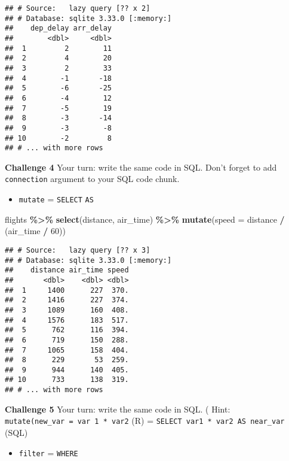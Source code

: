 \documentclass[
]{book}
\newenvironment{Shaded}{\begin{snugshade}}{\end{snugshade}}
\newcommand{\DataTypeTok}[1]{\textcolor[rgb]{0.13,0.29,0.53}{#1}}
\newcommand{\DecValTok}[1]{\textcolor[rgb]{0.00,0.00,0.81}{#1}}
\newcommand{\KeywordTok}[1]{\textcolor[rgb]{0.13,0.29,0.53}{\textbf{#1}}}
\newcommand{\NormalTok}[1]{#1}
\newcommand{\OperatorTok}[1]{\textcolor[rgb]{0.81,0.36,0.00}{\textbf{#1}}}
\newcommand{\StringTok}[1]{\textcolor[rgb]{0.31,0.60,0.02}{#1}}
\providecommand{\tightlist}{%
  \setlength{\itemsep}{0pt}\setlength{\parskip}{0pt}}
\begin{document}
\begin{verbatim}
## # Source:   lazy query [?? x 2]
## # Database: sqlite 3.33.0 [:memory:]
##    dep_delay arr_delay
##        <dbl>     <dbl>
##  1         2        11
##  2         4        20
##  3         2        33
##  4        -1       -18
##  5        -6       -25
##  6        -4        12
##  7        -5        19
##  8        -3       -14
##  9        -3        -8
## 10        -2         8
## # ... with more rows
\end{verbatim}

\textbf{Challenge 4}
Your turn: write the same code in SQL. Don't forget to add \texttt{connection} argument to your SQL code chunk.

\begin{itemize}
\tightlist
\item
  \texttt{mutate} = \texttt{SELECT} \texttt{AS}
\end{itemize}

\begin{Shaded}
\begin{Highlighting}[]
\NormalTok{flights }\OperatorTok{\%\textgreater{}\%}
\StringTok{  }\KeywordTok{select}\NormalTok{(distance, air\_time) }\OperatorTok{\%\textgreater{}\%}\StringTok{  }
\StringTok{  }\KeywordTok{mutate}\NormalTok{(}\DataTypeTok{speed =}\NormalTok{ distance }\OperatorTok{/}\StringTok{ }\NormalTok{(air\_time }\OperatorTok{/}\StringTok{ }\DecValTok{60}\NormalTok{)) }
\end{Highlighting}
\end{Shaded}

\begin{verbatim}
## # Source:   lazy query [?? x 3]
## # Database: sqlite 3.33.0 [:memory:]
##    distance air_time speed
##       <dbl>    <dbl> <dbl>
##  1     1400      227  370.
##  2     1416      227  374.
##  3     1089      160  408.
##  4     1576      183  517.
##  5      762      116  394.
##  6      719      150  288.
##  7     1065      158  404.
##  8      229       53  259.
##  9      944      140  405.
## 10      733      138  319.
## # ... with more rows
\end{verbatim}

\textbf{Challenge 5}
Your turn: write the same code in SQL. (
Hint: \texttt{mutate(new\_var\ =\ var\ 1\ *\ var2} (R) = \texttt{SELECT\ var1\ *\ var2\ AS\ near\_var} (SQL)

\begin{itemize}
\tightlist
\item
  \texttt{filter} = \texttt{WHERE}
\end{itemize}
\end{document}
